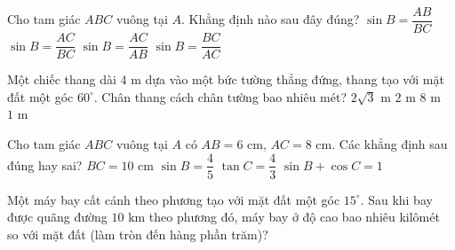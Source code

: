 

\begin{ex}%
	Cho tam giác $ABC$ vuông tại $A$. Khẳng định nào sau đây đúng?
	\choice
	{$\sin B=\dfrac{AB}{BC}$}
	{\True $\sin B=\dfrac{AC}{BC}$}
	{$\sin B=\dfrac{AC}{AB}$}
	{$\sin B=\dfrac{BC}{AC}$}
\end{ex}

\begin{ex}%
	Một chiếc thang dài $4\text{ m}$ dựa vào một bức tường thẳng đứng, thang tạo với mặt đất một góc $60^\circ$. Chân thang cách chân tường bao nhiêu mét?
	\choice
	{$2\sqrt3\text{ m}$}
	{\True $2\text{ m}$}
	{$8\text{ m}$}
	{$1\text{ m}$}
\end{ex}

\begin{ex}%
	Cho tam giác $ABC$ vuông tại $A$ có $AB=6\text{ cm}$, $AC=8\text{ cm}$. Các khẳng định sau đúng hay sai?
	\choiceTF
	{\True $BC=10\text{ cm}$}
	{\True $\sin B=\dfrac45$}
	{$\tan C=\dfrac43$}
	{$\sin B+\cos C=1$}
\end{ex}

\begin{bt}%
	Một máy bay cất cánh theo phương tạo với mặt đất một góc $15^\circ$. Sau khi bay được quãng đường $10\text{ km}$ theo phương đó, máy bay ở độ cao bao nhiêu kilômét so với mặt đất (làm tròn đến hàng phần trăm)?
\end{bt}

